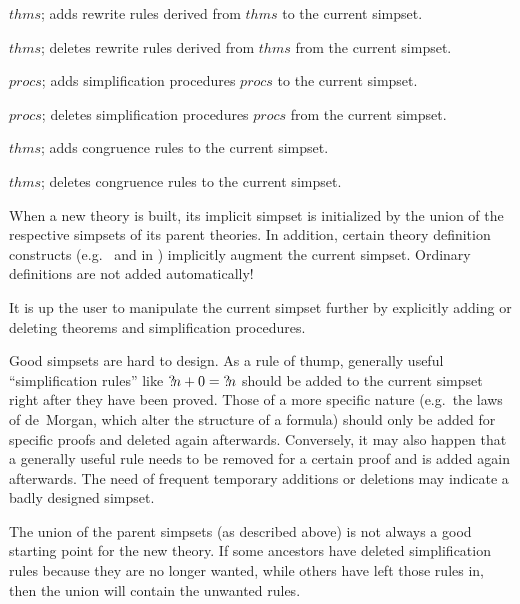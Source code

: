 \begin{ttdescription}

\item[\ttindexbold{Addsimps} $thms$;] adds rewrite rules derived from
  $thms$ to the current simpset.
  
\item[\ttindexbold{Delsimps} $thms$;] deletes rewrite rules derived
  from $thms$ from the current simpset.
  
\item[\ttindexbold{Addsimprocs} $procs$;] adds simplification
  procedures $procs$ to the current simpset.
  
\item[\ttindexbold{Delsimprocs} $procs$;] deletes simplification
  procedures $procs$ from the current simpset.
  
\item[\ttindexbold{Addcongs} $thms$;] adds congruence rules to the
  current simpset.
  
\item[\ttindexbold{Delcongs} $thms$;] deletes congruence rules to the
  current simpset.

\end{ttdescription}

When a new theory is built, its implicit simpset is initialized by the
union of the respective simpsets of its parent theories.  In addition,
certain theory definition constructs (e.g.\  and
 in \HOL) implicitly augment the current simpset.
Ordinary definitions are not added automatically!

It is up the user to manipulate the current simpset further by
explicitly adding or deleting theorems and simplification procedures.

\medskip

Good simpsets are hard to design.  As a rule of thump, generally
useful ``simplification rules'' like ${?\!n}+0 = {?\!n}$ should be
added to the current simpset right after they have been proved.  Those
of a more specific nature (e.g.\ the laws of de~Morgan, which alter
the structure of a formula) should only be added for specific proofs
and deleted again afterwards.  Conversely, it may also happen that a
generally useful rule needs to be removed for a certain proof and is
added again afterwards.  The need of frequent temporary additions or
deletions may indicate a badly designed simpset.

\begin{warn}
  The union of the parent simpsets (as described above) is not always
  a good starting point for the new theory.  If some ancestors have
  deleted simplification rules because they are no longer wanted,
  while others have left those rules in, then the union will contain
  the unwanted rules.
\end{warn}


